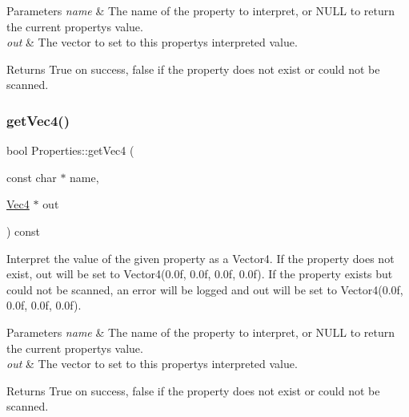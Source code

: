 \begin{DoxyParams}{Parameters}
{\em name} & The name of the property to interpret, or N\+U\+LL to return the current property\textquotesingle{}s value. \\
\hline
{\em out} & The vector to set to this property\textquotesingle{}s interpreted value.\\
\hline
\end{DoxyParams}
\begin{DoxyReturn}{Returns}
True on success, false if the property does not exist or could not be scanned. 
\end{DoxyReturn}
\mbox{\label{classProperties_a10f930a0553b781cb2de09c6b738f15e}} 
\subsubsection{\texorpdfstring{get\+Vec4()}{getVec4()}\hspace{0.1cm}{\footnotesize\ttfamily [1/2]}}
{\footnotesize\ttfamily bool Properties\+::get\+Vec4 (\begin{DoxyParamCaption}\item[{const char $\ast$}]{name,  }\item[{\hyperlink{classVec4}{Vec4} $\ast$}]{out }\end{DoxyParamCaption}) const}

Interpret the value of the given property as a Vector4. If the property does not exist, out will be set to Vector4(0.\+0f, 0.\+0f, 0.\+0f, 0.\+0f). If the property exists but could not be scanned, an error will be logged and out will be set to Vector4(0.\+0f, 0.\+0f, 0.\+0f, 0.\+0f).


\begin{DoxyParams}{Parameters}
{\em name} & The name of the property to interpret, or N\+U\+LL to return the current property\textquotesingle{}s value. \\
\hline
{\em out} & The vector to set to this property\textquotesingle{}s interpreted value.\\
\hline
\end{DoxyParams}
\begin{DoxyReturn}{Returns}
True on success, false if the property does not exist or could not be scanned. 
\end{DoxyReturn}
\mbox{\label{classProperties_a10f930a0553b781cb2de09c6b738f15e}} 
